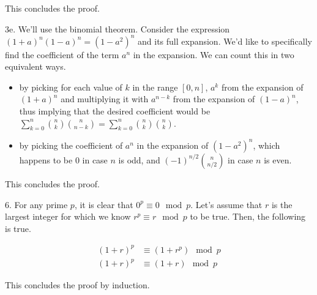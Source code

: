 \documentclass{article}
\begin{document}
This concludes the proof.

3e. We'll use the binomial theorem. Consider the expression $(1 + a)^n(1 - a)^n = (1 - a^2)^n$ and its full expansion. We'd like to specifically find the coefficient of the term $a^n$ in the expansion. We can count this in two equivalent ways.

\begin{itemize}
    \item by picking for each value of $k$ in the range $[0, n]$, $a^k$ from the expansion of $(1 + a)^n$ and multiplying it with $a^{n - k}$ from the expansion of $(1 - a)^n$, thus implying that the desired coefficient would be $\sum_{k=0}^n{n \choose k}{n \choose n - k} = \sum_{k=0}^n{n \choose k}{n \choose k}$.
    \item by picking the coefficient of $a^n$ in the expansion of $(1 - a^2)^n$, which happens to be $0$ in case $n$ is odd, and $(-1)^{n/2}{n \choose n / 2}$ in case $n$ is even.
\end{itemize}

This concludes the proof.

6. For any prime $p$, it is clear that $0^p \equiv 0 \mod{p}$. Let's assume that $r$ is the largest integer for which we know $r^p \equiv r \mod{p}$ to be true. Then, the following is true.

\begin{align*}
    (1 + r)^p &\equiv (1 + r^p) \mod{p} \\
    (1 + r)^p &\equiv (1 + r) \mod{p}
\end{align*}

This concludes the proof by induction.
\end{document}
